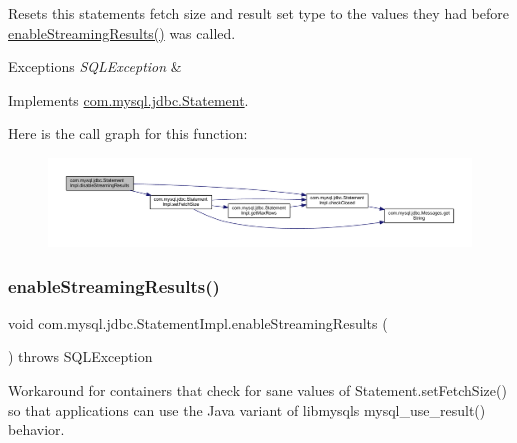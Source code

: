 Resets this statements fetch size and result set type to the values they had before \mbox{\hyperlink{classcom_1_1mysql_1_1jdbc_1_1_statement_impl_aebd63b45b20e164efe403d4c1d5bebc9}{enable\+Streaming\+Results()}} was called.


\begin{DoxyExceptions}{Exceptions}
{\em S\+Q\+L\+Exception} & \\
\hline
\end{DoxyExceptions}


Implements \mbox{\hyperlink{interfacecom_1_1mysql_1_1jdbc_1_1_statement_a68a7ee39de3b6cc9743674b40c5d9f73}{com.\+mysql.\+jdbc.\+Statement}}.

Here is the call graph for this function\+:
\nopagebreak
\begin{figure}[H]
\begin{center}
\leavevmode
\includegraphics[width=350pt]{classcom_1_1mysql_1_1jdbc_1_1_statement_impl_a1189cc8b7b69c3abdcee0cedb03298f5_cgraph}
\end{center}
\end{figure}
\mbox{\label{classcom_1_1mysql_1_1jdbc_1_1_statement_impl_aebd63b45b20e164efe403d4c1d5bebc9}} 
\subsubsection{\texorpdfstring{enable\+Streaming\+Results()}{enableStreamingResults()}}
{\footnotesize\ttfamily void com.\+mysql.\+jdbc.\+Statement\+Impl.\+enable\+Streaming\+Results (\begin{DoxyParamCaption}{ }\end{DoxyParamCaption}) throws S\+Q\+L\+Exception}

Workaround for containers that \textquotesingle{}check\textquotesingle{} for sane values of Statement.\+set\+Fetch\+Size() so that applications can use the Java variant of libmysql\textquotesingle{}s mysql\+\_\+use\+\_\+result() behavior.


